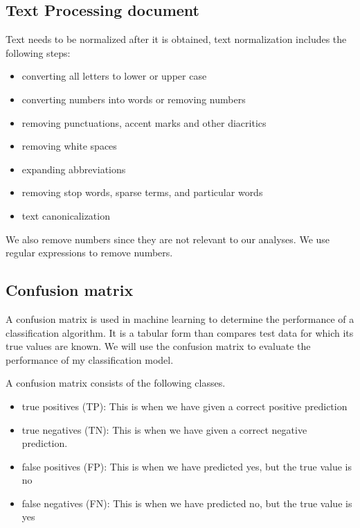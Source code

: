 \subsection{Text Processing document}
Text needs to be normalized after it is obtained, text normalization includes the following steps:
\begin{itemize}
\item converting all letters to lower or upper case
\item converting numbers into words or removing numbers
\item removing punctuations, accent marks and other diacritics
\item removing white spaces
\item expanding abbreviations
\item removing stop words, sparse terms, and particular words
\item text canonicalization
\end{itemize}

We also remove numbers since they are not relevant to our analyses. We use regular expressions to remove numbers.




\subsection{Confusion matrix}
A confusion matrix is used in machine learning to determine the performance of a classification algorithm. It is a tabular form than compares test data for which its true values are known. We will use the confusion matrix to evaluate the performance of my classification model.

A confusion matrix consists of the following classes.
 \begin{itemize}

\item
true positives (TP): This is when we have given a correct positive prediction

\item
true negatives (TN): This is when we have given a correct negative prediction.

\item
false positives (FP): This is when we have predicted yes, but the true value is no

\item
false negatives (FN): This is when we have predicted no, but the true value is yes

\end{itemize}

